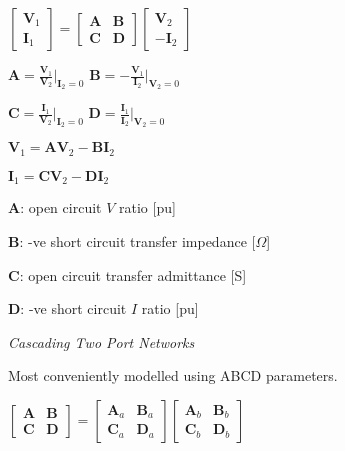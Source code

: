 \documentclass[twocolumn]{article}
\begin{document}
\begin{minipage}{0.39\columnwidth}
    $\begin{bmatrix}
        \mathbf V_1 \\ \mathbf I_1
    \end{bmatrix} =
    \begin{bmatrix}
        \mathbf A & \mathbf B \\
        \mathbf C & \mathbf D
    \end{bmatrix}
    \begin{bmatrix}
        \mathbf V_2 \\ - \mathbf I_2
    \end{bmatrix}$
\end{minipage}
\hfill
\begin{minipage}{0.55\columnwidth}
    $\mathbf A = \frac{\mathbf V_1}{\mathbf V_2} \bigg|_{\mathbf I_2 = 0}$ \hfill $\mathbf B = -\frac{\mathbf V_1}{\mathbf I_2} \bigg|_{\mathbf V_2 = 0}$

    $\mathbf C = \frac{\mathbf I_1}{\mathbf V_2} \bigg|_{\mathbf I_2 = 0}$ \hfill $\mathbf D = \frac{\mathbf I_1}{\mathbf I_2} \bigg|_{\mathbf V_2 = 0}$
\end{minipage}

$\mathbf V_1 = \mathbf A \mathbf V_2 - \mathbf B \mathbf I_2$

$\mathbf I_1 = \mathbf C \mathbf V_2 - \mathbf D \mathbf I_2$

$\mathbf A$: open circuit $V$ ratio [pu]

$\mathbf B$: -ve short circuit transfer impedance [$\Omega$]

$\mathbf C$: open circuit transfer admittance [S]

$\mathbf D$: -ve short circuit $I$ ratio [pu]

\vspace{-.5em}
\dotfill

\textit{Cascading Two Port Networks}

Most conveniently modelled using ABCD parameters.

$\begin{bmatrix}
    \mathbf A & \mathbf B \\
    \mathbf C & \mathbf D
\end{bmatrix} =
\begin{bmatrix}
    \mathbf A_a & \mathbf B_a \\
    \mathbf C_a & \mathbf D_a
\end{bmatrix}
\begin{bmatrix}
    \mathbf A_b & \mathbf B_b \\
    \mathbf C_b & \mathbf D_b
\end{bmatrix}$
\end{document}
